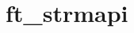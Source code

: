 \chapter{ft\+\_\+strmapi}
\hypertarget{md_Documentation_2ft__strmapi}{}\label{md_Documentation_2ft__strmapi}
